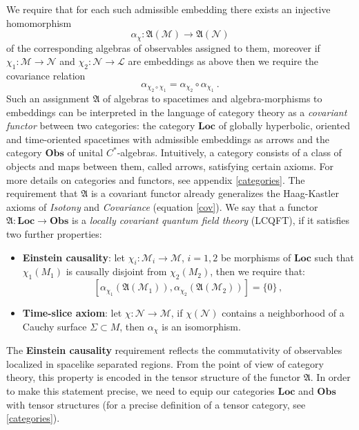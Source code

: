 \documentclass[11pt]{article}
\newcommand{\fA}{\mathfrak{A}}
\newcommand{\Lcal}{\mathcal {L}}
\newcommand{\Ncal}{\mathcal{N}}
\newcommand{\Mcal}{\mathcal{M}}
\newcommand{\Loc}{\mathrm{\mathbf{Loc}}}       %
\newcommand{\Obs}{\mathrm{\mathbf{Obs}}}       %
\newcommand{\al}{\alpha}
\newcommand{\1}{\mathds{1}}                         %
\newcommand{\be}{\begin{equation}}
\newcommand{\ee}{\end{equation}}
\begin{document}
We require that for each such admissible embedding there exists an injective homomorphism 
\be
\alpha_{\chi}:\mathfrak{A}(\Mcal)\to\mathfrak{A}(\Ncal)
\ee
of the corresponding algebras of observables assigned to them, moreover if $\chi_1:\Mcal\to \Ncal$ and $\chi_2:\Ncal\to \Lcal$ are embeddings as above then we require the covariance relation
\be\label{cov}
\alpha_{\chi_2\circ\chi_1}=\alpha_{\chi_2}\circ\alpha_{\chi_1} \ .
\ee
Such an assignment $\mathfrak{A}$ of algebras to spacetimes and algebra-morphisms to embeddings can be interpreted in the language of category theory as a \textit{covariant functor} between two categories: the category $\Loc$ of globally hyperbolic, oriented and time-oriented spacetimes with admissible embeddings as arrows and the category $\Obs$ of unital $C^*$-algebras. Intuitively, a category consists of a class of objects and maps between them, called arrows, satisfying certain axioms. For more details on categories and functors, see appendix \ref{categories}. The requirement that $\fA$ is a covariant functor  already generalizes the Haag-Kastler axioms of \textit{Isotony} and \textit{Covariance} (equation \eqref{cov}). We say that a functor $\mathfrak{A}: \Loc\rightarrow \Obs$ is a \textit{locally covariant quantum field theory} (LCQFT), if it satisfies two further properties:
\begin{itemize}
\item \textbf{Einstein causality}: let $\chi_i:\Mcal_i\rightarrow \Mcal$, $i=1,2$ be morphisms of $\Loc$ such that $\chi_1(M_1)$ is causally disjoint from $\chi_2(M_2)$, then we require that:
\[
[\al_{\chi_1}(\fA(\Mcal_1)),\al_{\chi_2}(\fA(\Mcal_2))]=\{0\}\,,
\]
\item \textbf{Time-slice axiom}: let $\chi:\Ncal\rightarrow \Mcal$, if $\chi(\Ncal)$ contains a neighborhood of a Cauchy surface $\Sigma\subset M$, then $\al_\chi$ is an isomorphism.
\end{itemize}

The \textbf{Einstein causality} requirement reflects the commutativity of observables localized in spacelike separated regions. From the point of view of category theory, this property is encoded in the tensor structure of the functor $\mathfrak{A}$. In order to make this statement precise, we need to equip our categories $\Loc$ and $\Obs$ with tensor structures (for a precise definition of a tensor category, see \ref{categories}).
\end{document}

